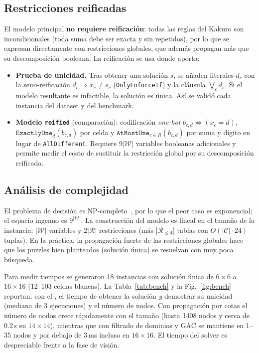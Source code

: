 \documentclass[conference,a4paper]{IEEEtran}\def\HAVEIEEE{1}%
\begin{document}
\subsection{Restricciones reificadas}\label{sec:reif}
El modelo principal \textbf{no requiere reificación}: todas las reglas del Kakuro son incondicionales (toda suma debe ser exacta y sin repetidos), por lo que se expresan directamente con restricciones globales, que además propagan más que su descomposición booleana. La reificación se usa donde aporta:
\begin{itemize}
  \item \textbf{Prueba de unicidad.} Tras obtener una solución $s$, se añaden literales $d_c$ con la semi-reificación $d_c\Rightarrow x_c\neq s_c$ (\texttt{OnlyEnforceIf}) y la cláusula $\bigvee_{c} d_c$. Si el modelo resultante es infactible, la solución es única. Así se validó cada instancia del dataset y del benchmark.
  \item \textbf{Modelo \texttt{reified}} (comparación): codificación \emph{one-hot} $b_{c,d}\Leftrightarrow(x_c=d)$, $\texttt{ExactlyOne}_d(b_{c,d})$ por celda y $\texttt{AtMostOne}_{c\in R}(b_{c,d})$ por suma y dígito en lugar de \texttt{AllDifferent}. Requiere $9|\mathcal{W}|$ variables booleanas adicionales y permite medir el costo de sustituir la restricción global por su descomposición reificada.
\end{itemize}

\subsection{Análisis de complejidad}
El problema de decisión es NP-completo~\cite{seta2002,ruepp2010}, por lo que el peor caso es exponencial; el espacio ingenuo es $9^{|\mathcal{W}|}$. La construcción del modelo es lineal en el tamaño de la instancia: $|\mathcal{W}|$ variables y $2|\mathcal{R}|$ restricciones (más $|\mathcal{R}_{\le4}|$ tablas con $O(|\mathcal{C}|\cdot 24)$ tuplas). En la práctica, la propagación fuerte de las restricciones globales hace que los puzzles bien planteados (solución única) se resuelvan con muy poca búsqueda.

Para medir tiempos se generaron 18 instancias con solución única de $6\times6$ a $16\times16$ (12--103 celdas blancas). La Tabla~\ref{tab:bench} y la Fig.~\ref{fig:bench} reportan, con el \solverbackend, el tiempo de obtener la solución \emph{y} demostrar su unicidad (mediana de 3 ejecuciones) y el número de nodos. Con propagación por cotas el número de nodos crece rápidamente con el tamaño (hasta 1408 nodos y cerca de 0.2\,s en $14\times14$), mientras que con filtrado de dominios y GAC se mantiene en 1--35 nodos y por debajo de 3\,ms incluso en $16\times16$. El tiempo del solver es despreciable frente a la fase de visión.
\end{document}
